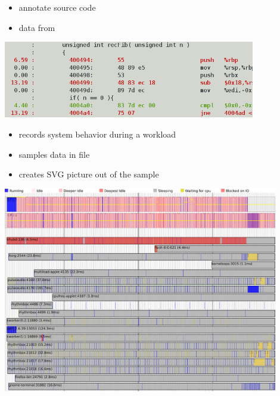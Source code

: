 \begin{frame}[fragile]{}
\begin{itemize}
  \item annotate source code
  \item data from 
\end{itemize}
\begin{center}
  \includegraphics[width=11cm]{res/perfannotate}
\end{center}
\end{frame}

\begin{frame}{}
\begin{itemize}
  \item records system behavior during a workload
  \item samples data in file
  \item creates SVG picture out of the sample
\end{itemize}
\pause
\includegraphics[width=12cm]{res/timechart}
\end{frame}

